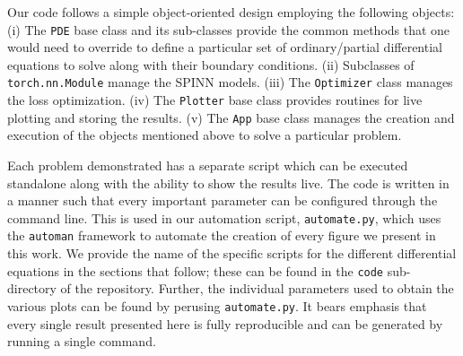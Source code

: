 \documentclass[12pt]{article}
\newcommand{\code}[1]{\lstinline{#1}}
\begin{document}
Our code follows a simple object-oriented design employing the following objects:
(i) The \code{PDE} base class and its sub-classes provide the common methods that one would need to override to define a particular set of ordinary/partial differential equations to solve along with their boundary conditions.
(ii) Subclasses of \code{torch.nn.Module} manage the SPINN models.
(iii) The \code{Optimizer} class manages the loss optimization.
(iv) The \code{Plotter} base class provides routines for live plotting and storing the results.
(v) The \code{App} base class manages the creation and execution of the objects mentioned above to solve a particular problem.

Each problem demonstrated has a separate script which can be executed standalone along with the ability to show the results live. The code is written in a manner such that every important parameter can be configured through the command line.  This is used in our automation script, \code{automate.py}, which uses the \code{automan} framework to automate the creation of every figure we present in this work.  We provide the name of the specific scripts for the different differential equations in the sections that follow; these can be found in the \code{code} sub-directory of the repository. Further, the individual parameters used to obtain the various plots can be found by perusing \code{automate.py}.  It bears emphasis that every single result presented here is fully reproducible and can be generated by running a single command.
\end{document}
